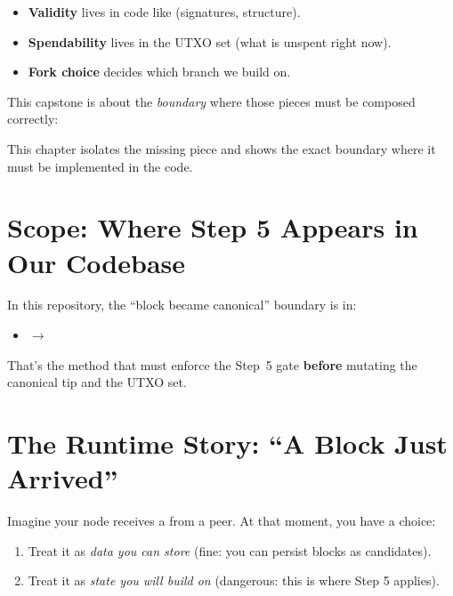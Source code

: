 \begin{itemize}
  \item \textbf{Validity} lives in code like  (signatures, structure).
  \item \textbf{Spendability} lives in the UTXO set (what is unspent right now).
  \item \textbf{Fork choice} decides which branch we build on.
\end{itemize}

This capstone is about the \emph{boundary} where those pieces must be composed correctly:

\begin{infobox}
This chapter isolates the missing piece and shows the exact boundary where it must be implemented in the code.
\end{infobox}

\section{Scope: Where Step 5 Appears in Our Codebase}
\label{sec:ch10-scope}

In this repository, the ``block became canonical'' boundary is in:

\begin{itemize}
  \item {} $\to$ 
\end{itemize}

That's the method that must enforce the Step~5 gate \textbf{before} mutating the canonical tip and the UTXO set.

\section{The Runtime Story: ``A Block Just Arrived''}
\label{sec:ch10-runtime-story}

Imagine your node receives a  from a peer. At that moment, you have a choice:

\begin{enumerate}
  \item Treat it as \emph{data you can store} (fine: you can persist blocks as candidates).
  \item Treat it as \emph{state you will build on} (dangerous: this is where Step 5 applies).
\end{enumerate}

